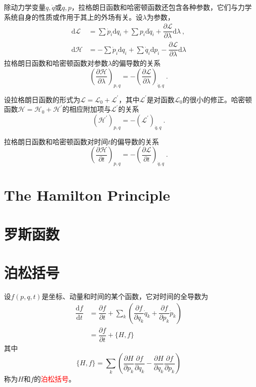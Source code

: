 \documentclass[11pt,a4paper]{article}
\newcommand{\dif}{\mathrm{d}}
\begin{document}
除动力学变量$q, \dot q$或$q, p$，拉格朗日函数和哈密顿函数还包含各种参数，它们与力学系统自身的性质或作用于其上的外场有关。设$\lambda$为参数，
\begin{align*}
\dif \mathscr L &= \sum \dot p_i \dif q_i +\sum p_i \dif \dot q_i + \dfrac{\partial \mathscr L}{\partial \lambda} \dif \lambda ~, \\
\dif \mathscr H &= -\sum \dot p_i \dif q_i +\sum \dot q_i \dif p_i -\dfrac{\partial \mathscr L}{\partial \lambda} \dif \lambda
\end{align*}
拉格朗日函数和哈密顿函数对参数$\lambda$的偏导数的关系
\begin{equation}
\left( \dfrac{\partial \mathscr H}{\partial \lambda} \right)_{p, q} = -\left( \dfrac{\partial \mathscr L}{\partial \lambda} \right)_{\dot q, q} ~.
\end{equation}

设拉格朗日函数的形式为$\mathscr L = \mathscr L_0 +\mathscr L^\prime$，其中$\mathscr L^\prime$是对函数$\mathscr L_0$的很小的修正。哈密顿函数$\mathscr H = \mathscr H_0 +\mathscr H^\prime$的相应附加项与$\mathscr L^\prime$的关系
\begin{equation}
\left( \mathscr H^\prime \right)_{p, q} = -\left( \mathscr L^\prime \right)_{\dot q, q} ~.
\end{equation}

拉格朗日函数和哈密顿函数对时间$t$的偏导数的关系
\begin{equation}
\left( \dfrac{\partial \mathscr H}{\partial t} \right)_{p, q} = -\left( \dfrac{\partial \mathscr L}{\partial t} \right)_{\dot q, q} ~.
\end{equation}





\section{The Hamilton Principle} 


\section{罗斯函数}









\section{泊松括号}
设$f(p, q, t)$是坐标、动量和时间的某个函数，它对时间的全导数为
\begin{align*}
\dfrac{\dif f}{\dif t} &= \dfrac{\partial f}{\partial t} + \sum_k \left(\dfrac{\partial f}{\partial q_k} \dot q_k + \dfrac{\partial f}{\partial p_k} \dot p_k \right) \\
&= \dfrac{\partial f}{\partial t} + \{H, f \} 
\end{align*}
其中
\begin{equation}
\{H, f \} = \sum_k \left(\dfrac{\partial H}{\partial p_k} \dfrac{\partial f}{\partial q_k}  -\dfrac{\partial H}{\partial q_k}  \dfrac{\partial f}{\partial p_k} \right)
\end{equation}
称为$H$和$f$的\textcolor{red}{泊松括号}。
\end{document}
